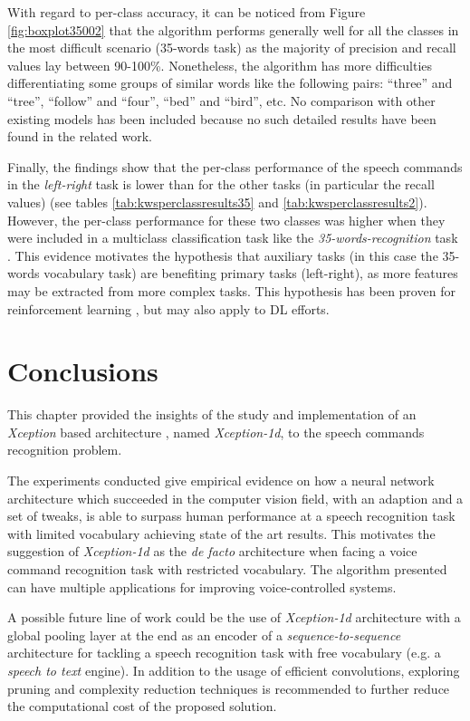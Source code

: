 With regard to per-class accuracy, it can be noticed from Figure \ref{fig:boxplot35002} that the algorithm performs generally well for all the classes in the most difficult scenario (35-words task) as the majority of precision and recall values lay between 90-100\%. Nonetheless, the algorithm has more difficulties differentiating some groups of similar words like the following pairs: ``three'' and ``tree'', ``follow'' and ``four'', ``bed'' and ``bird'', etc. No comparison with other existing models has been included because no such detailed results have been found in the related work.

Finally, the findings show that the per-class performance of the speech commands in the \textit{left-right} task is lower than for the other tasks (in particular the recall values) (see tables \ref{tab:kwsperclassresults35} and \ref{tab:kwsperclassresults2}). However, the per-class performance for these two classes was higher when they were included in a multiclass classification task like the \textit{35-words-recognition} task \autocite{caruana1997}. This evidence motivates the hypothesis that auxiliary tasks (in this case the 35-words vocabulary task) are benefiting primary tasks (left-right), as more features may be extracted from more complex tasks. This hypothesis has been proven for reinforcement learning \autocite{Jaderberg2016}, but may also apply to DL efforts.




\section{Conclusions} \label{sec:conclusion}
This chapter provided the insights of the study and implementation of an \textit{Xception} based architecture \autocite{chollet2017}, named \textit{Xception-1d}, to the speech commands recognition problem.

The experiments conducted give empirical evidence on how a neural network architecture which succeeded in the computer vision field, with an adaption and a set of tweaks, is able to surpass human performance at a speech recognition task with limited vocabulary achieving state of the art results. This motivates the suggestion of \textit{Xception-1d} as the \textit{de facto} architecture when facing a voice command recognition task with restricted vocabulary. The algorithm presented can have multiple  applications for improving voice-controlled systems.

A possible future line of work could be  the use of \textit{Xception-1d} architecture with a global pooling layer at the end  as an encoder of a \textit{sequence-to-sequence} architecture for tackling a speech recognition task with free vocabulary (e.g. a \textit{speech to text} engine). In addition to the usage of efficient convolutions, exploring pruning and complexity reduction techniques is recommended to further reduce the computational cost of the proposed solution.


